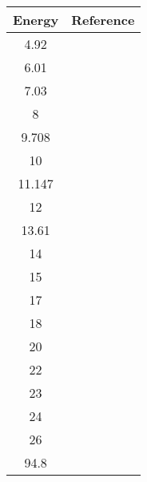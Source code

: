 \begin{tabular}{|c||c|} 
    \hline 
    \bf{Energy} & \bf{Reference} \\
    \hline
    \hline 
    4.92 & \cite{Kinney1972}\\
    6.01 & \cite{Kinney1972}\\
    7.03 & \cite{Kinney1972}\\
    8 & \cite{Bucher1974}\\
    9.708 & \cite{Glendinning1982}\\
    10 & \cite{Anli1989}\\
    11.147 & \cite{Glendinning1982}\\
    12 & \cite{Anli1989}\\
    13.61 & \cite{Boerker1988}\\
    14 & \cite{Anli1989}\\
    15 & \cite{Dave1983}\\
    17 & \cite{Anli1989}\\
    18 & \cite{Delaroche1986}\\
    20 & \cite{Delaroche1986}\\
    22 & \cite{Delaroche1986}\\
    23 & \cite{Lam1985}\\
    24 & \cite{Delaroche1986}\\
    26 & \cite{Delaroche1986}\\
    94.8 & \cite{Mermod2006}\\
    \hline
\end{tabular}
